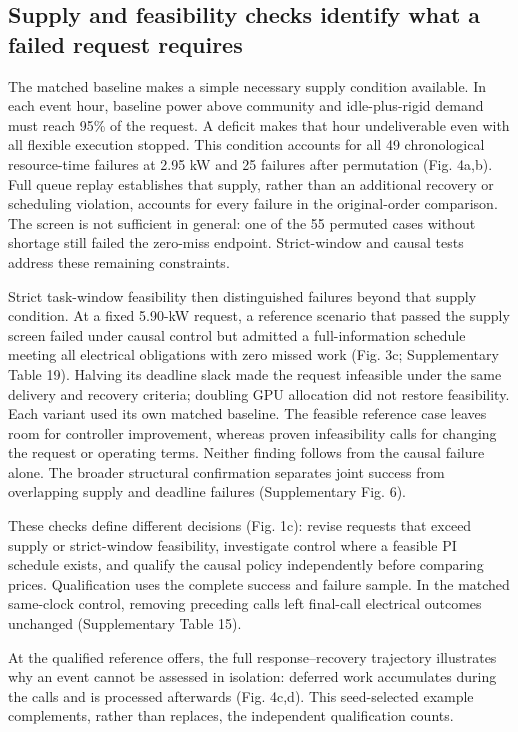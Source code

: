 \documentclass[10pt,a4paper]{article}
\begin{document}
\subsection*{Supply and feasibility checks identify what a failed request requires}

The matched baseline makes a simple necessary supply condition available. In each event hour, baseline power above community and idle-plus-rigid demand must reach 95\% of the request. A deficit makes that hour undeliverable even with all flexible execution stopped. This condition accounts for all 49 chronological resource-time failures at 2.95 kW and 25 failures after permutation (Fig. 4a,b). Full queue replay establishes that supply, rather than an additional recovery or scheduling violation, accounts for every failure in the original-order comparison. The screen is not sufficient in general: one of the 55 permuted cases without shortage still failed the zero-miss endpoint. Strict-window and causal tests address these remaining constraints.


Strict task-window feasibility then distinguished failures beyond that supply condition. At a fixed 5.90-kW request, a reference scenario that passed the supply screen failed under causal control but admitted a full-information schedule meeting all electrical obligations with zero missed work (Fig. 3c; Supplementary Table 19). Halving its deadline slack made the request infeasible under the same delivery and recovery criteria; doubling GPU allocation did not restore feasibility. Each variant used its own matched baseline. The feasible reference case leaves room for controller improvement, whereas proven infeasibility calls for changing the request or operating terms. Neither finding follows from the causal failure alone. The broader structural confirmation separates joint success from overlapping supply and deadline failures (Supplementary Fig. 6).


These checks define different decisions (Fig. 1c): revise requests that exceed supply or strict-window feasibility, investigate control where a feasible PI schedule exists, and qualify the causal policy independently before comparing prices. Qualification uses the complete success and failure sample. In the matched same-clock control, removing preceding calls left final-call electrical outcomes unchanged (Supplementary Table 15).


At the qualified reference offers, the full response–recovery trajectory illustrates why an event cannot be assessed in isolation: deferred work accumulates during the calls and is processed afterwards (Fig. 4c,d). This seed-selected example complements, rather than replaces, the independent qualification counts.
\end{document}
